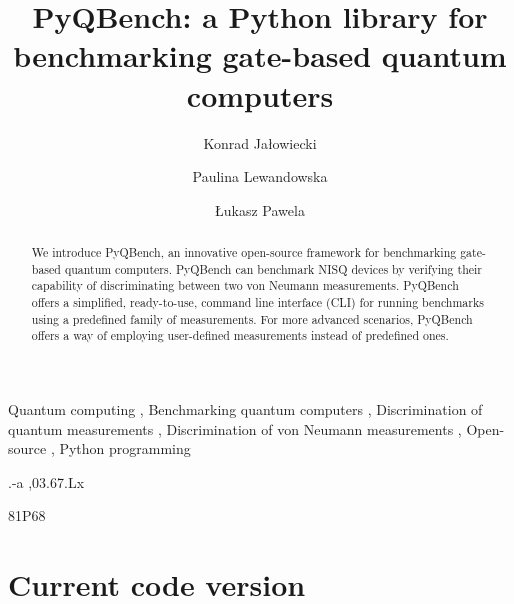 \documentclass[preprint,12pt, a4paper, dvipsnames]{elsarticle}
\newcommand{\1}{{\rm 1\hspace{-0.9mm}l}}
\theoremstyle{definition}
\begin{document}
\begin{frontmatter}

\title{PyQBench: a Python library for benchmarking gate-based quantum computers}

\author{Konrad Jałowiecki}

\author{Paulina Lewandowska}
\author{\L ukasz Pawela}

\address{Institute of Theoretical and Applied Informatics, Polish Academy
	of Sciences, Ba{\l}tycka~5, 44-100 Gliwice, Poland}

\begin{abstract}

We introduce PyQBench, an innovative open-source framework for benchmarking gate-based quantum
computers. PyQBench can benchmark NISQ devices by verifying their capability of discriminating
between two von Neumann measurements. PyQBench offers a simplified, ready-to-use, command line
interface (CLI) for running benchmarks using a predefined family of measurements. For more advanced
scenarios, PyQBench offers a way of employing user-defined measurements instead of predefined ones.

\end{abstract}

\begin{keyword}
Quantum computing \sep
Benchmarking quantum computers \sep
Discrimination of quantum measurements \sep
Discrimination of von Neumann measurements \sep
Open-source \sep
Python programming

.-a \sep 03.67.Lx

\MSC 81P68

\end{keyword}

\end{frontmatter}

\section*{Current code version}
\label{}
\end{document}
